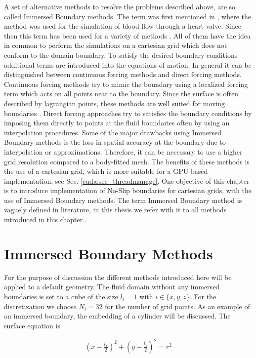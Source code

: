 A set of alternative methods to resolve the problems described above, are so called Immersed Boundary methods.
The term was first mentioned in \citep{peskin72}, where the method was used for the simulation of blood flow through a heart valve.
Since then this term has been used for a variety of methods \citep{Mittal2005}.
All of them have the idea in common to perform the simulations on a cartesian grid which does not conform to the domain boundary.
To satisfy the desired boundary conditions additional terms are introduced into the equations of motion.
In general it can be distinguished between continuous forcing methods and direct forcing methods.
Continuous forcing methods try to mimic the boundary using a localized forcing term which acts on all points near to the boundary.
Since the surface is often described by lagrangian points, these methods are well suited for moving boundaries \citep{Mittal2005}.
Direct forcing approaches try to satisfies the boundary conditions by imposing them directly to points at the fluid boundaries  often by using  an interpolation procedures.
Some of the major drawbacks using Immersed Boundary methods is the loss in  spatial accuracy at the boundary due to interpolation or approximations.
Therefore, it can be necessary to use a higher grid resolution
compared to a body-fitted mesh.
The benefits of these methods is the use of a cartesian grid, which is more suitable for a GPU-based implementation, see Sec. \ref{cuda:sec_threadmanage}.
One objective of this chapter is to introduce implementation of No-Slip boundaries for cartesian grids, with the use of Immersed Boundary methods.
The term Immersed Boundary method is vaguely defined in literature, in this thesis we refer with it to all methods introduced in this chapter..

\section{Immersed Boundary Methods}

For the purpose of discussion the different methods introduced here will be applied to a default geometry.
The fluid domain without any immersed boundaries is set to a cube of the size $l_i= 1$ with  $i \in \{x, y, z\}$.
For the discretization we choose $N_i = 32$ for the number of grid points.
As an example of an immersed boundary, the embedding of a cylinder will be discussed. The  surface equation is

\begin{align}
    \label{ibm:eq_cylinder_intro}
    \left(x - \frac{l_x}{2}\right)^2 + \left(y - \frac{l_y}{2}\right)^2 = r^2
\end{align}

